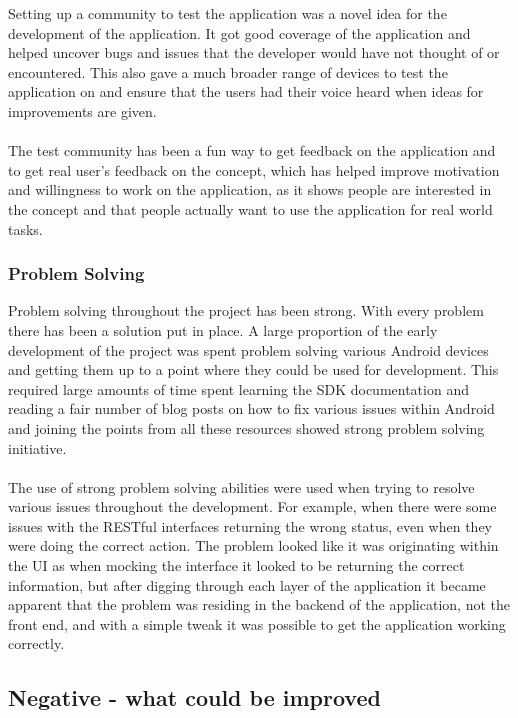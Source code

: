Setting up a community to test the application was a novel idea for the development of the application. It got good coverage of the application and helped uncover bugs and issues that the developer would have not thought of or encountered. This also gave a much broader range of devices to test the application on and ensure that the users had their voice heard when ideas for improvements are given.\\
\\
The test community has been a fun way to get feedback on the application and to get real user's feedback on the concept, which has helped improve motivation and willingness to work on the application, as it shows people are interested in the concept and that people actually want to use the application for real world tasks.

\subsubsection{Problem Solving}

Problem solving throughout the project has been strong. With every problem there has been a solution put in place. A large proportion of the early development of the project was spent problem solving various Android devices and getting them up to a point where they could be used for development. This required large amounts of time spent learning the SDK documentation and reading a fair number of blog posts on how to fix various issues within Android and joining the points from all these resources showed strong problem solving initiative.\\
\\
The use of strong problem solving abilities were used when trying to resolve various issues throughout the development. For example, when there were some issues with the RESTful interfaces returning the wrong status, even when they were doing the correct action. The problem looked like it was originating within the UI as when mocking the interface it looked to be returning the correct information, but after digging through each layer of the application it became apparent that the problem was residing in the backend of the application, not the front end, and with a simple tweak it was possible to get the application working correctly.

\subsection{Negative - what could be improved}

